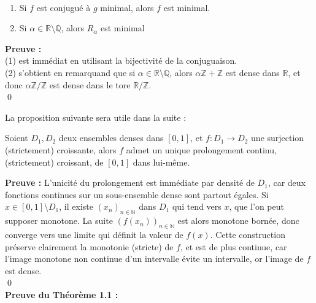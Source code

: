 \documentclass[11pt,a4paper]{article}
\begin{document}
\begin{proposition} ~ 
\begin{enumerate}
\item Si $f$ est conjugué à $g$ minimal, alors $f$ est minimal.
\item Si $\alpha \in \mathbb{R} \setminus \mathbb{Q}$, alors $R_\alpha$ est minimal
\end{enumerate}
\end{proposition}

\textbf{Preuve :} \\ 
(1) est immédiat en utilisant la bijectivité de la conjuguaison. \\
(2) s'obtient en remarquand que si $\alpha \in \mathbb{R} \setminus \mathbb{Q}$, alors $\alpha\mathbb{Z} + \mathbb{Z}$ est dense dans $\mathbb{R}$, et donc $\alpha\mathbb{Z}/\mathbb{Z}$ est dense dans le tore $\mathbb{R}/\mathbb{Z}$. \\ \qed

La proposition suivante sera utile dans la suite :

\begin{proposition}
Soient $D_1,D_2$ deux ensembles denses dans $[0,1]$, et $f : D_1 \to D_2$ une surjection (strictement) croissante, alors $f$ admet un unique prolongement continu, (strictement) croissant, de $[0,1]$ dans lui-même.
\end{proposition}

\textbf{Preuve :} L'unicité du prolongement est immédiate par densité de $D_1$, car deux fonctions continues sur un sous-ensemble dense sont partout égales. Si $x\in [0,1]\setminus D_1$, il existe $(x_n)_{n\in \mathbb{N}}$ dans $D_1$ qui tend vers $x$, que l'on peut supposer monotone. La suite $(f(x_n))_{n\in\mathbb{N}}$ est alors monotone bornée, donc converge vers une limite qui définit la valeur de $f(x)$.
Cette construction préserve clairement la monotonie (stricte) de $f$, et est de plus continue, car l'image monotone non continue d'un intervalle évite un intervalle, or l'image de $f$ est dense. \\ \qed
\\

\textbf{Preuve du Théorème 1.1 :} \\
\end{document}
